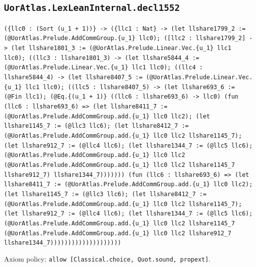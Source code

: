 \documentclass[11pt]{article}
\begin{document}
\subsection*{\texttt{UorAtlas.LexLeanInternal.decl1552}}
\noindent\texttt{(\{llc0 : (Sort (u\_1 + 1))\} -> (\{llc1 : Nat\} -> (let llshare1799\_2 := (@UorAtlas.Prelude.AddCommGroup.\{u\_1\} llc0); ([llc2 : llshare1799\_2] -> (let llshare1801\_3 := (@UorAtlas.Prelude.Linear.Vec.\{u\_1\} llc1 llc0); ((llc3 : llshare1801\_3) -> (let llshare5844\_4 := (@UorAtlas.Prelude.Linear.Vec.\{u\_1\} llc1 llc0); ((llc4 : llshare5844\_4) -> (let llshare8407\_5 := (@UorAtlas.Prelude.Linear.Vec.\{u\_1\} llc1 llc0); ((llc5 : llshare8407\_5) -> (let llshare693\_6 := (@Fin llc1); (@Eq.\{(u\_1 + 1)\} ((llc6 : llshare693\_6) -> llc0) (fun (llc6 : llshare693\_6) => (let llshare8411\_7 := (@UorAtlas.Prelude.AddCommGroup.add.\{u\_1\} llc0 llc2); (let llshare1145\_7 := (@llc3 llc6); (let llshare8412\_7 := (@UorAtlas.Prelude.AddCommGroup.add.\{u\_1\} llc0 llc2 llshare1145\_7); (let llshare912\_7 := (@llc4 llc6); (let llshare1344\_7 := (@llc5 llc6); (@UorAtlas.Prelude.AddCommGroup.add.\{u\_1\} llc0 llc2 (@UorAtlas.Prelude.AddCommGroup.add.\{u\_1\} llc0 llc2 llshare1145\_7 llshare912\_7) llshare1344\_7))))))) (fun (llc6 : llshare693\_6) => (let llshare8411\_7 := (@UorAtlas.Prelude.AddCommGroup.add.\{u\_1\} llc0 llc2); (let llshare1145\_7 := (@llc3 llc6); (let llshare8412\_7 := (@UorAtlas.Prelude.AddCommGroup.add.\{u\_1\} llc0 llc2 llshare1145\_7); (let llshare912\_7 := (@llc4 llc6); (let llshare1344\_7 := (@llc5 llc6); (@UorAtlas.Prelude.AddCommGroup.add.\{u\_1\} llc0 llc2 llshare1145\_7 (@UorAtlas.Prelude.AddCommGroup.add.\{u\_1\} llc0 llc2 llshare912\_7 llshare1344\_7))))))))))))))))))))}\par
\noindent Axiom policy: \texttt{allow [Classical.choice, Quot.sound, propext]}.\par
\end{document}
